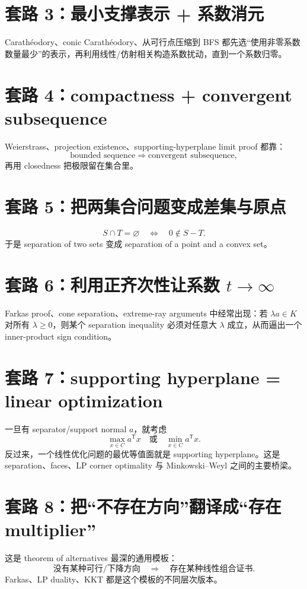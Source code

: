 \documentclass[11pt,a4paper,openany]{ctexrep}
\theoremstyle{definition}
\newcommand{\transpose}{\mathsf{T}}
\begin{document}
\section{套路 3：最小支撑表示 + 系数消元}
Carath\'eodory、conic Carath\'eodory、从可行点压缩到 BFS 都先选“使用非零系数数量最少”的表示，再利用线性/仿射相关构造系数扰动，直到一个系数归零。

\section{套路 4：compactness + convergent subsequence}
Weierstrass、projection existence、supporting-hyperplane limit proof 都靠：
\[
\text{bounded sequence}\Rightarrow\text{convergent subsequence},
\]
再用 closedness 把极限留在集合里。

\section{套路 5：把两集合问题变成差集与原点}
\[
S\cap T=\varnothing
\quad\Longleftrightarrow\quad
0\notin S-T.
\]
于是 separation of two sets 变成 separation of a point and a convex set。

\section{套路 6：利用正齐次性让系数 $t\to\infty$}
Farkas proof、cone separation、extreme-ray arguments 中经常出现：若 $\lambda a\in K$ 对所有 $\lambda\ge0$，则某个 separation inequality 必须对任意大 $\lambda$ 成立，从而逼出一个 inner-product sign condition。

\section{套路 7：supporting hyperplane = linear optimization}
一旦有 separator/support normal $a$，就考虑
\[
\max_{x\in C}a^\transpose x
\quad\text{或}\quad
\min_{x\in C}a^\transpose x.
\]
反过来，一个线性优化问题的最优等值面就是 supporting hyperplane。这是 separation、faces、LP corner optimality 与 Minkowski--Weyl 之间的主要桥梁。

\section{套路 8：把“不存在方向”翻译成“存在 multiplier”}
这是 theorem of alternatives 最深的通用模板：
\[
\text{没有某种可行/下降方向}
\quad\Longrightarrow\quad
\text{存在某种线性组合证书}.
\]
Farkas、LP duality、KKT 都是这个模板的不同层次版本。
\end{document}
